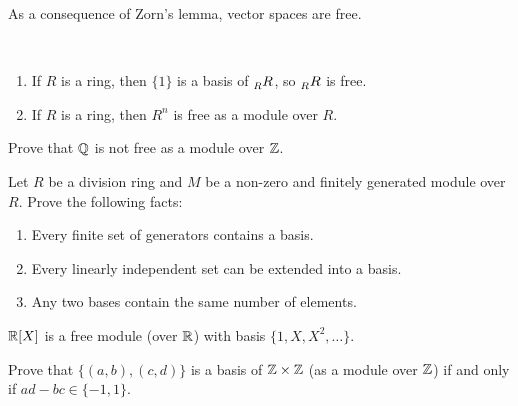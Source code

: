 As a consequence of Zorn's lemma, 
vector spaces are free. 

\begin{examples}\
\begin{enumerate}
    \item If $R$ is a ring, then $\{1\}$ is a basis of $\prescript{}{R}{R}$, so $\prescript{}{R}{R}$ is free.
    \item If $R$ is a ring, then $R^n$ is free as a module over $R$. 
\end{enumerate}
\end{examples}

\begin{exercise}
    Prove that $\mathbb{Q}$ is not free as a module over $\mathbb{Z}$. 
\end{exercise}

\begin{exercise}
    Let $R$ be a division ring and $M$ be a non-zero and finitely generated module over $R$.
    Prove the following facts:
    \begin{enumerate}
        \item Every finite set of generators contains a basis.
        \item Every linearly independent set can be extended into a basis.
        \item Any two bases contain the same number of elements.
    \end{enumerate}
\end{exercise}

\begin{example}
    $\mathbb{R}[X]$ is a free module (over $\mathbb{R}$) with basis $\{1,X,X^2,\dots\}$. 
\end{example}

\begin{exercise}
    Prove that $\{(a,b),(c,d)\}$ is a basis of $\mathbb{Z}\times\mathbb{Z}$ (as a module over $\mathbb{Z}$) if and only if
    $ad-bc\in\{-1,1\}$. 
\end{exercise}